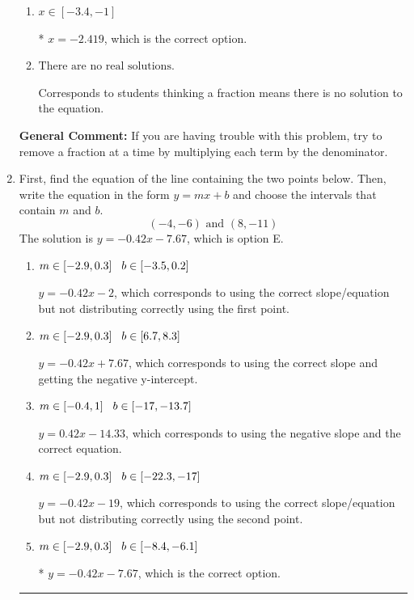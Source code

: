 \documentclass{extbook}[14pt]
\newcommand{\litem}[1]{\item #1

\rule{\textwidth}{0.4pt}}
\begin{document}
\begin{enumerate}
{\begin{enumerate}[label=\Alph*.]
 $x = -0.597$, which corresponds to dividing the second number in the numerator by the denominator rather than dividing BOTH parts of the numerator by the denominator (or removing the fractions through multiplication).
\item \( x \in [-3.4, -1] \)

* $x = -2.419$, which is the correct option.
\item \( \text{There are no real solutions.} \)

Corresponds to students thinking a fraction means there is no solution to the equation.
\end{enumerate}

\textbf{General Comment:} If you are having trouble with this problem, try to remove a fraction at a time by multiplying each term by the denominator.
}
\litem{
First, find the equation of the line containing the two points below. Then, write the equation in the form $ y=mx+b $ and choose the intervals that contain $m$ and $b$.
\[ (-4, -6) \text{ and } (8, -11) \]The solution is \( y = -0.42x -7.67 \), which is option E.\begin{enumerate}[label=\Alph*.]
\item \( m \in [-2.9, 0.3] \hspace*{3mm} b \in [-3.5, 0.2] \)

 $y = -0.42x -2$, which corresponds to using the correct slope/equation but not distributing correctly using the first point.
\item \( m \in [-2.9, 0.3] \hspace*{3mm} b \in [6.7, 8.3] \)

 $y = -0.42x + 7.67$, which corresponds to using the correct slope and getting the negative y-intercept.
\item \( m \in [-0.4, 1] \hspace*{3mm} b \in [-17, -13.7] \)

 $y = 0.42x -14.33$, which corresponds to using the negative slope and the correct equation.
\item \( m \in [-2.9, 0.3] \hspace*{3mm} b \in [-22.3, -17] \)

 $y = -0.42x -19$, which corresponds to using the correct slope/equation but not distributing correctly using the second point.
\item \( m \in [-2.9, 0.3] \hspace*{3mm} b \in [-8.4, -6.1] \)

* $y = -0.42x -7.67$, which is the correct option.
\end{enumerate}

}
\end{enumerate}
\end{document}
